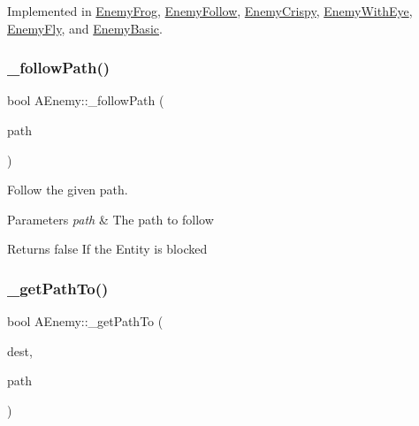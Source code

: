 Implemented in \hyperlink{class_enemy_frog_a2cf685062369505da75844967e16d344}{Enemy\+Frog}, \hyperlink{class_enemy_follow_a6fefcf7802be9f3a3b7d8e3b9a0b1704}{Enemy\+Follow}, \hyperlink{class_enemy_crispy_a82cd9389ee451c2ca4e71ff86989e870}{Enemy\+Crispy}, \hyperlink{class_enemy_with_eye_a34caaf4c68b5ad06059fe61d9d1f8026}{Enemy\+With\+Eye}, \hyperlink{class_enemy_fly_a405b9f97c6818d2b96056270aeca921f}{Enemy\+Fly}, and \hyperlink{class_enemy_basic_a143ec308f913a3eb4a7f47ad839fd049}{Enemy\+Basic}.

\mbox{\label{class_a_enemy_ae9fafd83ac6040298120c6e3a8656743}} 
\subsubsection{\texorpdfstring{\+\_\+follow\+Path()}{\_followPath()}}
{\footnotesize\ttfamily bool A\+Enemy\+::\+\_\+follow\+Path (\begin{DoxyParamCaption}\item[{std\+::deque$<$ \hyperlink{struct_path_node}{Path\+Node} $>$ \&}]{path }\end{DoxyParamCaption})\hspace{0.3cm}{\ttfamily [protected]}}



Follow the given path. 


\begin{DoxyParams}{Parameters}
{\em path} & The path to follow \\
\hline
\end{DoxyParams}
\begin{DoxyReturn}{Returns}
false If the Entity is blocked 
\end{DoxyReturn}
\mbox{\label{class_a_enemy_a5ff3b836a7a98499a1a4019f7238b4d0}} 
\subsubsection{\texorpdfstring{\+\_\+get\+Path\+To()}{\_getPathTo()}}
{\footnotesize\ttfamily bool A\+Enemy\+::\+\_\+get\+Path\+To (\begin{DoxyParamCaption}\item[{glm\+::ivec2}]{dest,  }\item[{std\+::deque$<$ \hyperlink{struct_path_node}{Path\+Node} $>$ \&}]{path }\end{DoxyParamCaption})\hspace{0.3cm}{\ttfamily [protected]}}



